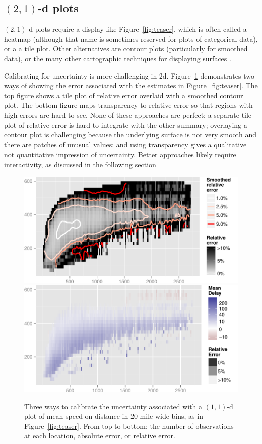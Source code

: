 \documentclass[journal]{vgtc}                %
\begin{document}
\subsection{\texorpdfstring{$(2,1)$}{(2, 1)}-d plots}
\label{sub:2d-plots}

$(2, 1)$-d plots require a display like Figure~\ref{fig:teaser}, which is often called a heatmap \citep{wilkinson:2009} (although that name is sometimes reserved for plots of categorical data), or a a tile plot. Other alternatives are contour plots (particularly for smoothed data), or the many other cartographic techniques for displaying surfaces \citep{kennelly:2002}.

Calibrating for uncertainty is more challenging in 2d. Figure~\ref{fig:2d-error} demonstrates two ways of showing the error associated with the estimates in Figure~\ref{fig:teaser}. The top figure shows a tile plot of relative error overlaid with a smoothed contour plot. The bottom figure maps transparency to relative error so that regions with high errors are hard to see. None of these approaches are perfect: a separate tile plot of relative error is hard to integrate with the other summary; overlaying a contour plot is challenging because the underlying surface is not very smooth and there are patches of unusual values; and using transparency gives a qualitative not quantitative impression of uncertainty. Better approaches likely require interactivity, as discussed in the following section

\begin{figure}
  \centering
   \includegraphics[width=\linewidth]{2d-error}
   \includegraphics[width=\linewidth]{2d-alpha}
 \caption{Three ways to calibrate the uncertainty associated with a $(1,1)$-d plot of mean speed on distance in 20-mile-wide bins, as in Figure~\ref{fig:teaser}. From top-to-bottom: the number of observations at each location, absolute error, or relative error.}
 \label{fig:2d-error}
\end{figure}
\end{document}
